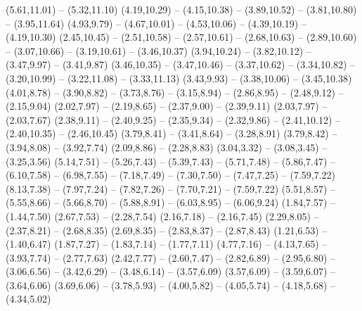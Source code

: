 \expandafter\def\csname geo:Autobahn:A25\endcsname{
  (5.61,11.01) -- (5.32,11.10)}
\expandafter\def\csname geo:Autobahn:A27\endcsname{
  (4.19,10.29) -- (4.15,10.38) -- (3.89,10.52) -- (3.81,10.80) -- (3.95,11.64)
  (4.93,9.79) -- (4.67,10.01) -- (4.53,10.06) -- (4.39,10.19) -- (4.19,10.30)}
\expandafter\def\csname geo:Autobahn:A28\endcsname{
  (2.45,10.45) -- (2.51,10.58) -- (2.57,10.61) -- (2.68,10.63) -- (2.89,10.60) -- (3.07,10.66) -- (3.19,10.61) -- (3.46,10.37)
  (3.94,10.24) -- (3.82,10.12) -- (3.47,9.97) -- (3.41,9.87)}
\expandafter\def\csname geo:Autobahn:A29\endcsname{
  (3.46,10.35) -- (3.47,10.46) -- (3.37,10.62) -- (3.34,10.82) -- (3.20,10.99) -- (3.22,11.08) -- (3.33,11.13)
  (3.43,9.93) -- (3.38,10.06) -- (3.45,10.38)}
\expandafter\def\csname geo:Autobahn:A30\endcsname{
  (4.01,8.78) -- (3.90,8.82) -- (3.73,8.76) -- (3.15,8.94) -- (2.86,8.95) -- (2.48,9.12) -- (2.15,9.04)}
\expandafter\def\csname geo:Autobahn:A31\endcsname{
  (2.02,7.97) -- (2.19,8.65) -- (2.37,9.00) -- (2.39,9.11)
  (2.03,7.97) -- (2.03,7.67)
  (2.38,9.11) -- (2.40,9.25) -- (2.35,9.34) -- (2.32,9.86) -- (2.41,10.12) -- (2.40,10.35) -- (2.46,10.45)}
\expandafter\def\csname geo:Autobahn:A33\endcsname{
  (3.79,8.41) -- (3.41,8.64) -- (3.28,8.91)
  (3.79,8.42) -- (3.94,8.08) -- (3.92,7.74)}
\expandafter\def\csname geo:Autobahn:A35\endcsname{
  (2.09,8.86) -- (2.28,8.83)
  (3.04,3.32) -- (3.08,3.45) -- (3.25,3.56)}
\expandafter\def\csname geo:Autobahn:A38\endcsname{
  (5.14,7.51) -- (5.26,7.43) -- (5.39,7.43) -- (5.71,7.48) -- (5.86,7.47) -- (6.10,7.58) -- (6.98,7.55) -- (7.18,7.49) -- (7.30,7.50) -- (7.47,7.25) -- (7.59,7.22)
  (8.13,7.38) -- (7.97,7.24) -- (7.82,7.26) -- (7.70,7.21) -- (7.59,7.22)}
\expandafter\def\csname geo:Autobahn:A39\endcsname{
  (5.51,8.57) -- (5.55,8.66) -- (5.66,8.70) -- (5.88,8.91) -- (6.03,8.95) -- (6.06,9.24)}
\expandafter\def\csname geo:Autobahn:A40\endcsname{
  (1.84,7.57) -- (1.44,7.50)
  (2.67,7.53) -- (2.28,7.54)}
\expandafter\def\csname geo:Autobahn:A43\endcsname{
  (2.16,7.18) -- (2.16,7.45)
  (2.29,8.05) -- (2.37,8.21) -- (2.68,8.35)
  (2.69,8.35) -- (2.83,8.37) -- (2.87,8.43)}
\expandafter\def\csname geo:Autobahn:A44\endcsname{
  (1.21,6.53) -- (1.40,6.47)
  (1.87,7.27) -- (1.83,7.14) -- (1.77,7.11)
  (4.77,7.16) -- (4.13,7.65) -- (3.93,7.74) -- (2.77,7.63)}
\expandafter\def\csname geo:Autobahn:A45\endcsname{
  (2.42,7.77) -- (2.60,7.47) -- (2.82,6.89) -- (2.95,6.80) -- (3.06,6.56) -- (3.42,6.29) -- (3.48,6.14) -- (3.57,6.09)
  (3.57,6.09) -- (3.59,6.07) -- (3.64,6.06)
  (3.69,6.06) -- (3.78,5.93) -- (4.00,5.82) -- (4.05,5.74) -- (4.18,5.68) -- (4.34,5.02)}
